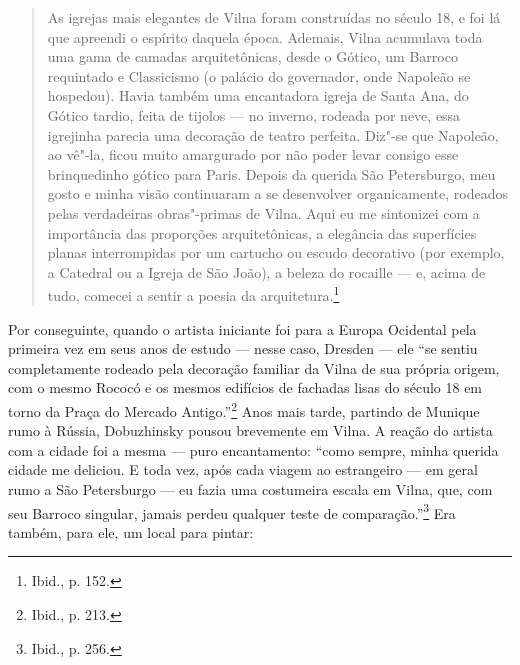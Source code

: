 \begin{quote}
As igrejas mais elegantes de Vilna foram construídas no século 18, e foi
lá que apreendi o espírito daquela época. Ademais, Vilna acumulava toda
uma gama de camadas arquitetônicas, desde o Gótico, um Barroco
requintado e Classicismo (o palácio do governador, onde Napoleão se
hospedou). Havia também uma encantadora igreja de Santa Ana, do Gótico
tardio, feita de tijolos --- no inverno, rodeada por neve, essa igrejinha
parecia uma decoração de teatro perfeita. Diz"-se que Napoleão, ao vê"-la,
ficou muito amargurado por não poder levar consigo esse brinquedinho
gótico para Paris. Depois da querida São Petersburgo, meu gosto e minha
visão continuaram a se desenvolver organicamente, rodeados pelas
verdadeiras obras"-primas de Vilna. Aqui eu me sintonizei com a
importância das proporções arquitetônicas, a elegância das superfícies
planas interrompidas por um cartucho ou escudo decorativo (por exemplo,
a Catedral ou a Igreja de São João), a beleza do rocaille --- e, acima de
tudo, comecei a sentir a poesia da arquitetura.\footnote{Ibid., p. 152.}
\end{quote}

%

Por conseguinte, quando o artista iniciante foi para a Europa Ocidental
pela primeira vez em seus anos de estudo --- nesse caso, Dresden --- ele
``se sentiu completamente rodeado pela decoração familiar da Vilna de
sua própria origem, com o mesmo Rococó e os mesmos edifícios de fachadas
lisas do século 18 em torno da Praça do Mercado Antigo.''\footnote{Ibid.,
  p. 213.} Anos mais tarde, partindo de Munique rumo à Rússia,
Dobuzhinsky pousou brevemente em Vilna. A reação do artista com a cidade
foi a mesma --- puro encantamento: ``como sempre, minha querida cidade me
deliciou. E toda vez, após cada viagem ao estrangeiro --- em geral rumo a
São Petersburgo --- eu fazia uma costumeira escala em Vilna, que, com seu
Barroco singular, jamais perdeu qualquer teste de
comparação.''\footnote{Ibid., p. 256.} Era também, para ele, um local
para pintar:

